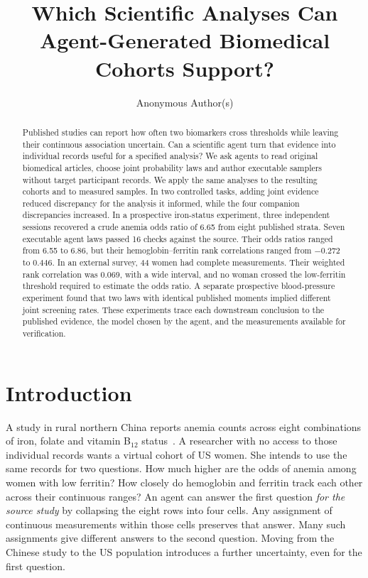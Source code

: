 \documentclass[sigconf,anonymous,review]{acmart}
\begin{document}
\title[Which Analyses Can Agent-Generated Cohorts Support?]{Which Scientific Analyses Can Agent-Gener\-ated Biomedical Cohorts Support?}
\author{Anonymous Author(s)}

\begin{abstract}
Published studies can report how often two biomarkers cross thresholds while leaving their continuous association uncertain. Can a scientific agent turn that evidence into individual records useful for a specified analysis? We ask agents to read original biomedical articles, choose joint probability laws and author executable samplers without target participant records. We apply the same analyses to the resulting cohorts and to measured samples. In two controlled tasks, adding joint evidence reduced discrepancy for the analysis it informed, while the four companion discrepancies increased. In a prospective iron-status experiment, three independent sessions recovered a crude anemia odds ratio of 6.65 from eight published strata. Seven executable agent laws passed 16 checks against the source. Their odds ratios ranged from 6.55 to 6.86, but their hemoglobin--ferritin rank correlations ranged from $-0.272$ to $0.446$. In an external survey, 44 women had complete measurements. Their weighted rank correlation was 0.069, with a wide interval, and no woman crossed the low-ferritin threshold required to estimate the odds ratio. A separate prospective blood-pressure experiment found that two laws with identical published moments implied different joint screening rates. These experiments trace each downstream conclusion to the published evidence, the model chosen by the agent, and the measurements available for verification.
\end{abstract}

\maketitle

\section{Introduction}
A study in rural northern China reports anemia counts across eight combinations of iron, folate and vitamin B$_{12}$ status~\cite{zhu}. A researcher with no access to those individual records wants a virtual cohort of US women. She intends to use the same records for two questions. How much higher are the odds of anemia among women with low ferritin? How closely do hemoglobin and ferritin track each other across their continuous ranges? An agent can answer the first question \emph{for the source study} by collapsing the eight rows into four cells. Any assignment of continuous measurements within those cells preserves that answer. Many such assignments give different answers to the second question. Moving from the Chinese study to the US population introduces a further uncertainty, even for the first question.
\end{document}
